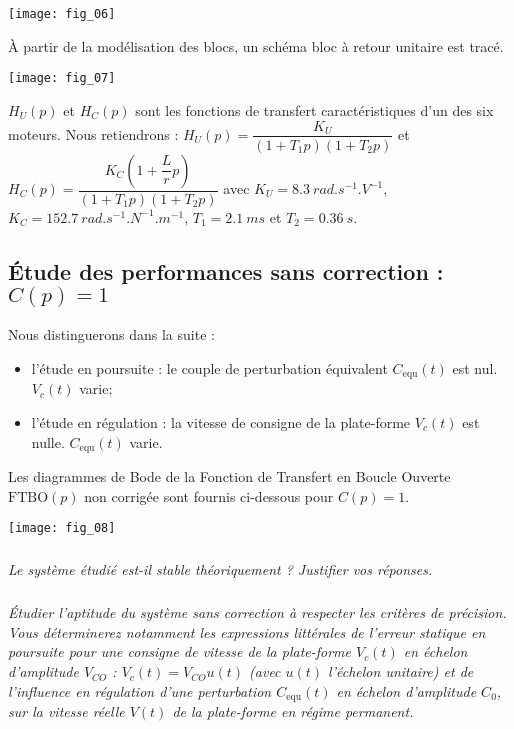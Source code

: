 \begin{multicols}{2}
\begin{center}
\texttt{[image: fig\_06]}
\end{center}

À partir de la modélisation des blocs, un schéma bloc à retour unitaire est tracé.

\begin{center}
\texttt{[image: fig\_07]}
\end{center}

$H_U( p)$ et $H_C( p)$ sont les fonctions de transfert caractéristiques d’un des six moteurs. Nous retiendrons :
$H_U( p) = \dfrac{K_U}{\left( 1+T_1 p\right)\left( 1+T_2 p\right)}$ et $H_C( p)= \dfrac{K_C\left(1+\dfrac{L}{r}p \right)}{\left( 1+T_1 p\right)\left( 1+T_2 p\right)}$ avec 
$K_U = \SI{8,3}{rad.s^{-1}.V^{-1}}$, 
$K_C = \SI{152,7}{rad.s^{-1}.N^{-1}.m^{-1}}$, 
$T_1 = \SI{2,1}{ms}$ et $T_2 = \SI{0,36}{s}$.

\subsection*{Étude des performances sans correction : $C( p) =1$}

Nous distinguerons dans la suite :
\begin{itemize}
\item l’étude en poursuite : le couple de perturbation équivalent $C_{\text{equ}} (t)$ est nul. $V_c(t)$ varie;
\item l’étude en régulation : la vitesse de consigne de la plate-forme $V_c (t)$ est nulle. $C_{\text{equ}} (t)$ varie.
\end{itemize}
Les diagrammes de Bode de la Fonction de Transfert en Boucle Ouverte $\text{FTBO}(p)$ non corrigée sont fournis ci-dessous pour $C( p) = 1$.


\begin{center}
\texttt{[image: fig\_08]}
\end{center}


\subparagraph{}\textit{Le système étudié est-il stable théoriquement ? Justifier vos réponses.}
\ifprof
\begin{corrige}
\end{corrige}
\else
\fi


\subparagraph{}\textit{Étudier l’aptitude du système sans correction à respecter les critères de précision. Vous déterminerez
notamment les expressions littérales de l’erreur statique en poursuite pour une consigne de vitesse de la
plate-forme $V_c(t)$ en échelon d’amplitude $V_{CO}$ : $V_c(t)=V_{CO}u(t)$ (avec $u(t)$ l’échelon unitaire) et de
l’influence en régulation d’une perturbation $C_{\text{equ}}(t)$ en échelon d’amplitude $C_0$, sur la vitesse réelle $V(t)$ de
la plate-forme en régime permanent.}
\ifprof
\begin{corrige}
\end{corrige}
\else
\fi


\end{multicols}
